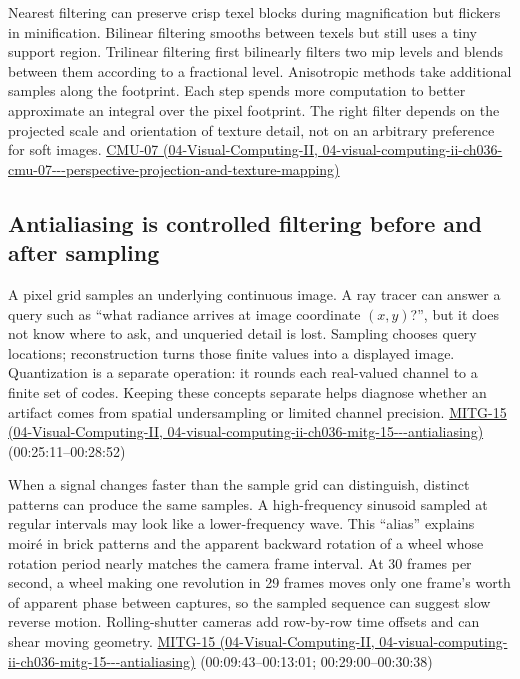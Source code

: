 Nearest filtering can preserve crisp texel blocks during magnification but flickers in minification. Bilinear filtering smooths between texels but still uses a tiny support region. Trilinear filtering first bilinearly filters two mip levels and blends between them according to a fractional level. Anisotropic methods take additional samples along the footprint. Each step spends more computation to better approximate an integral over the pixel footprint. The right filter depends on the projected scale and orientation of texture detail, not on an arbitrary preference for soft images. \href{../04-Visual-Computing-II/main.pdf\#nameddest=04-visual-computing-ii-ch036-cmu-07---perspective-projection-and-texture-mapping}{CMU-07 (04-Visual-Computing-II, 04-visual-computing-ii-ch036-cmu-07-\/-\/-perspective-projection-and-texture-mapping)}

\subsection{Antialiasing is controlled filtering before and after sampling}\label{03-visual-computing-i-ch004-antialiasing-is-controlled-filtering-before-and-after-sampling}

A pixel grid samples an underlying continuous image. A ray tracer can answer a query such as ``what radiance arrives at image coordinate \((x,y)\)?'', but it does not know where to ask, and unqueried detail is lost. Sampling chooses query locations; reconstruction turns those finite values into a displayed image. Quantization is a separate operation: it rounds each real-valued channel to a finite set of codes. Keeping these concepts separate helps diagnose whether an artifact comes from spatial undersampling or limited channel precision. \href{../04-Visual-Computing-II/main.pdf\#nameddest=04-visual-computing-ii-ch036-mitg-15---antialiasing}{MITG-15 (04-Visual-Computing-II, 04-visual-computing-ii-ch036-mitg-15-\/-\/-antialiasing)} (00:25:11--00:28:52)

When a signal changes faster than the sample grid can distinguish, distinct patterns can produce the same samples. A high-frequency sinusoid sampled at regular intervals may look like a lower-frequency wave. This ``alias'' explains moiré in brick patterns and the apparent backward rotation of a wheel whose rotation period nearly matches the camera frame interval. At 30 frames per second, a wheel making one revolution in 29 frames moves only one frame's worth of apparent phase between captures, so the sampled sequence can suggest slow reverse motion. Rolling-shutter cameras add row-by-row time offsets and can shear moving geometry. \href{../04-Visual-Computing-II/main.pdf\#nameddest=04-visual-computing-ii-ch036-mitg-15---antialiasing}{MITG-15 (04-Visual-Computing-II, 04-visual-computing-ii-ch036-mitg-15-\/-\/-antialiasing)} (00:09:43--00:13:01; 00:29:00--00:30:38)

